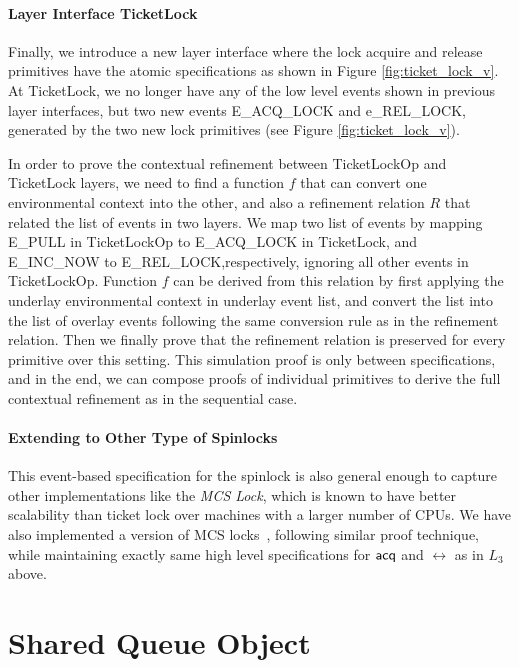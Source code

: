 \paragraph{Layer Interface TicketLock}

Finally, we introduce a new layer interface where the lock acquire and release
primitives have the atomic specifications as shown in Figure \ref{fig:ticket_lock_v}.
At TicketLock, we no longer have any of the low level events shown in previous
layer interfaces, but two new events \textsf{E\_ACQ\_LOCK} and \textsf{e\_REL\_LOCK},
generated by the two new lock primitives (see Figure \ref{fig:ticket_lock_v}).

In order to prove the contextual refinement between TicketLockOp and
TicketLock layers, we need to find a function $f$ that can convert
one environmental context into the other, and also a refinement relation
$R$ that related the list of events in two layers.
We map two list of events by mapping \textsf{E\_PULL} in 
TicketLockOp to \textsf{E\_ACQ\_LOCK} in TicketLock,
and \textsf{E\_INC\_NOW} to  \textsf{E\_REL\_LOCK},respectively, ignoring all other
events in TicketLockOp. Function $f$ can be derived from this relation by
first applying the underlay environmental context in underlay event list,
and convert the list into the list of overlay events following the same conversion
rule as in the refinement relation.
Then we finally prove that the refinement relation is preserved for every primitive
over this setting.
This simulation proof is only between specifications, and in the end,
we can compose proofs of individual primitives to derive the full
contextual refinement as in the sequential case.

\paragraph{Extending to Other Type of Spinlocks}
This event-based specification for the spinlock is also general enough
to capture  other implementations like the \emph{MCS Lock},
which is known to have better scalability than ticket lock
over machines with a larger number of CPUs. We have also
implemented a version of MCS locks~\cite{kim2017safety}, following
similar proof technique, while maintaining exactly same high level
specifications for $\mathsf{acq}$ and $\rel$ as in $L_3$ above.


\section{Shared Queue Object}

